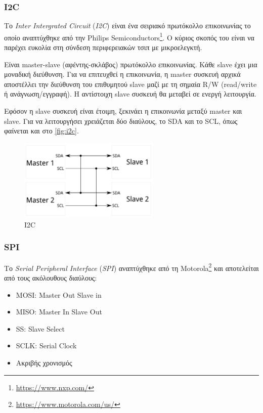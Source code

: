 \subsubsection{I2C}
\label{subsubsec:i2c}

Το \textit{Inter Intergrated Circuit} (\textit{I2C}) είναι ένα σειριακό πρωτόκολλο επικοινωνίας το οποίο αναπτύχθηκε από την Philips Semiconductors\footnote{\url{https://www.nxp.com/}}. Ο κύριος σκοπός του είναι να παρέχει ευκολία στη σύνδεση περιφερειακών τσιπ με μικροελεγκτή. 

Είναι master-slave (αφέντης-σκλάβος) πρωτόκολλο επικοινωνίας. Κάθε slave έχει μια μοναδική διεύθυνση. Για να επιτευχθεί η επικοινωνία, η master συσκευή αρχικά αποστέλλει την διεύθυνση του επιθυμητού slave μαζί με τη σημαία R/W (read/write ή ανάγνωση/εγγραφή). Η αντίστοιχη slave συσκευή θα μεταβεί σε ενεργή λειτουργία.

Εφόσον η slave συσκευή είναι έτοιμη, ξεκινάει η επικοινωνία μεταξύ master και slave. Για να λειτουργήσει χρειάζεται δύο διαύλους, το SDA και το SCL, όπως φαίνεται και στο \autoref{fig:i2c}.

\begin{figure}[!ht]
	\centering
	\includegraphics[width=0.6\textwidth]{./images/chapter3/i2c.png}
	\caption{I2C}
	\label{fig:i2c}
\end{figure}

\subsubsection{SPI}
\label{subsubsec:SPI}

Το \textit{Serial Peripheral Interface} (\textit{SPI}) αναπτύχθηκε από τη Motorola\footnote{\url{https://www.motorola.com/us/}} και αποτελείται από τους ακόλουθους διαύλους:

\begin{itemize}
	\item MOSI: Master Out Slave in
	\item MISO: Master In Slave Out
	\item SS: Slave Select
	\item SCLK: Serial Clock
	\item Ακριβής χρονισμός
\end{itemize}

